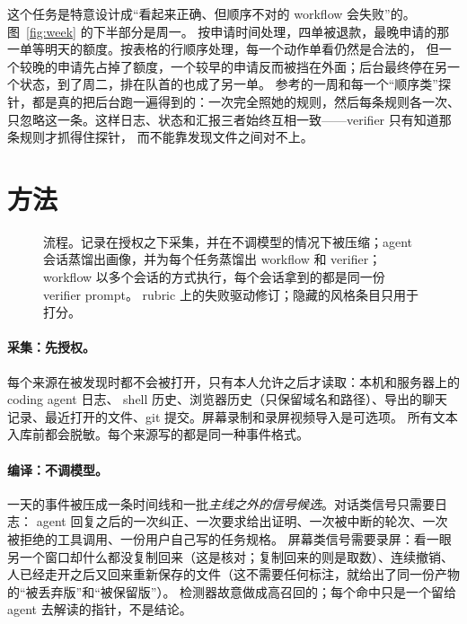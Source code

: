 \documentclass[10pt,UTF8,scheme=plain]{ctexart}
\begin{document}
这个任务是特意设计成“看起来正确、但顺序不对的 workflow 会失败”的。图~\ref{fig:week} 的下半部分是周一。
按申请时间处理，四单被退款，最晚申请的那一单等明天的额度。按表格的行顺序处理，每一个动作单看仍然是合法的，
但一个较晚的申请先占掉了额度，一个较早的申请反而被挡在外面；后台最终停在另一个状态，到了周二，排在队首的也成了另一单。
参考的一周和每一个“顺序类”探针，都是真的把后台跑一遍得到的：一次完全照她的规则，然后每条规则各一次、
只忽略这一条。这样日志、状态和汇报三者始终互相一致——verifier 只有知道那条规则才抓得住探针，
而不能靠发现文件之间对不上。

\section{方法}
\label{sec:method}

\begin{figure}[t]
\centering
\resizebox{\textwidth}{!}{}
\caption{流程。记录在授权之下采集，并在不调模型的情况下被压缩；agent 会话蒸馏出画像，并为每个任务蒸馏出
workflow 和 verifier；workflow 以多个会话的方式执行，每个会话拿到的都是同一份 verifier prompt。
rubric 上的失败驱动修订；隐藏的风格条目只用于打分。}
\label{fig:method}
\end{figure}

\paragraph{采集：先授权。} 每个来源在被发现时都不会被打开，只有本人允许之后才读取：本机和服务器上的 coding agent 日志、
shell 历史、浏览器历史（只保留域名和路径）、导出的聊天记录、最近打开的文件、git 提交。屏幕录制和录屏视频导入是可选项。
所有文本入库前都会脱敏。每个来源写的都是同一种事件格式。

\paragraph{编译：不调模型。} 一天的事件被压成一条时间线和一批\emph{主线之外的信号候选}。对话类信号只需要日志：
agent 回复之后的一次纠正、一次要求给出证明、一次被中断的轮次、一次被拒绝的工具调用、一份用户自己写的任务规格。
屏幕类信号需要录屏：看一眼另一个窗口却什么都没复制回来（这是核对；复制回来的则是取数）、连续撤销、
人已经走开之后又回来重新保存的文件（这不需要任何标注，就给出了同一份产物的“被丢弃版”和“被保留版”）。
检测器故意做成高召回的；每个命中只是一个留给 agent 去解读的指针，不是结论。
\end{document}
